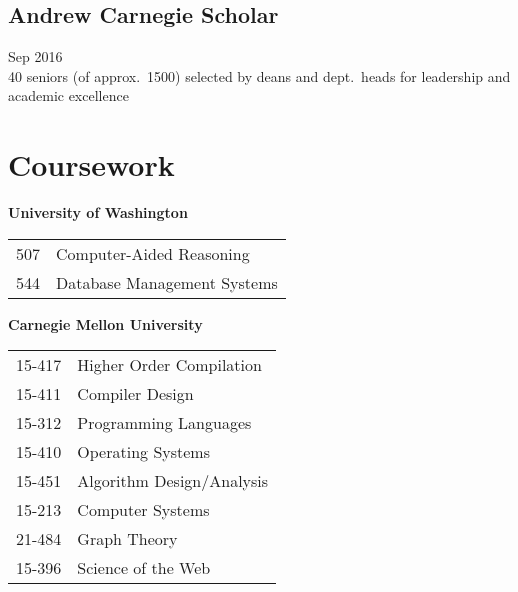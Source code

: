 \documentclass{article}
\begin{document}
\subsection{Andrew Carnegie Scholar}
\hfill Sep 2016 \\
40 seniors (of approx.~1500) selected by deans and dept.\ heads for leadership and academic excellence

\section{Coursework}


\begin{minipage}[t]{0.45\linewidth}
  \raggedright
  \textbf{University of Washington}
  \begin{tabular}{ll}
    507 & Computer-Aided Reasoning \\
    544 & Database Management Systems \\
  \end{tabular}
\end{minipage}
\hfill
\begin{minipage}[t]{0.45\linewidth}
  \raggedright
  \textbf{Carnegie Mellon University}
  \begin{tabular}{ll}
    15-417 & Higher Order Compilation  \\
    15-411 & Compiler Design                 \\
    15-312 & Programming Languages           \\
    15-410 & Operating Systems               \\
    15-451 & Algorithm Design/Analysis   \\
    15-213 & Computer Systems                \\
    21-484 & Graph Theory                    \\
    15-396 & Science of the Web              \\
  \end{tabular}
\end{minipage}
\end{document}
